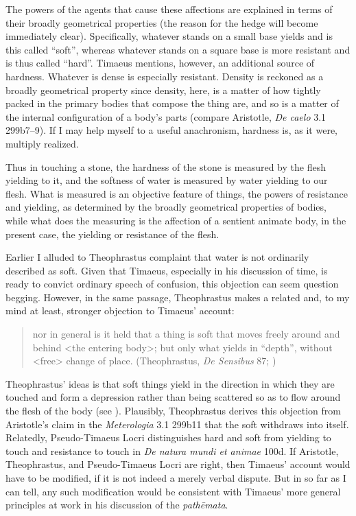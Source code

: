 The powers of the agents that cause these affections are explained in terms of their broadly geometrical properties (the reason for the hedge will become immediately clear). Specifically, whatever stands on a small base yields and is this called ``soft'', whereas whatever stands on a square base is more resistant and is thus called ``hard''. Timaeus mentions, however, an additional source of hardness. Whatever is dense is especially resistant. Density is reckoned as a broadly geometrical property since density, here, is a matter of how tightly packed in the primary bodies that compose the thing are, and so is a matter of the internal configuration of a body's parts (compare Aristotle, \emph{De caelo} 3.1 299b7--9). If I may help myself to a useful anachronism, hardness is, as it were, multiply realized.

Thus in touching a stone, the hardness of the stone is measured by the flesh yielding to it, and the softness of water is measured by water yielding to our flesh. What is measured is an objective feature of things, the powers of resistance and yielding, as determined by the broadly geometrical properties of bodies, while what does the measuring is the affection of a sentient animate body, in the present case, the yielding or resistance of the flesh.

Earlier I alluded to Theophrastus complaint that water is not ordinarily described as soft. Given that Timaeus, especially in his discussion of time, is ready to convict ordinary speech of confusion, this objection can seem question begging. However, in the same passage, Theophrastus makes a related and, to my mind at least, stronger objection to Timaeus' account:
\begin{quote}
	nor in general is it held that a thing is soft that moves freely around and behind <the entering body>; but only what yields in ``depth'', without <free> change of place. (Theophrastus, \emph{De Sensibus} 87; \citealt[147]{Stratton:1917vn})
\end{quote}
Theophrastus' ideas is that soft things yield in the direction in which they are touched and form a depression rather than being scattered so as to flow around the flesh of the body (see \citealt[213 n230]{Stratton:1917vn}). Plausibly, Theophrastus derives this objection from Aristotle's claim in the \emph{Meterologia} 3.1 299b11 that the soft withdraws into itself. Relatedly, Pseudo-Timaeus Locri distinguishes hard and soft from yielding to touch and resistance to touch in \emph{De natura mundi et animae} 100d. If Aristotle, Theophrastus, and Pseudo-Timaeus Locri are right, then Timaeus' account would have to be modified, if it is not indeed a merely verbal dispute. But in so far as I can tell, any such modification would be consistent with Timaeus' more general principles at work in his discussion of the \emph{pathēmata}.

